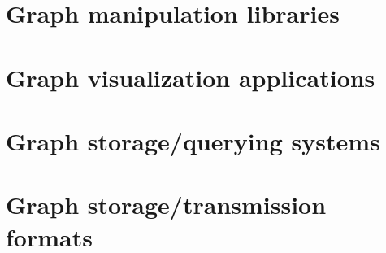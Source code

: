 

\section{Graph manipulation libraries}

\section{Graph visualization applications}

\section{Graph storage/querying systems}

\section{Graph storage/transmission formats}
\label{sec:tech/formats}

